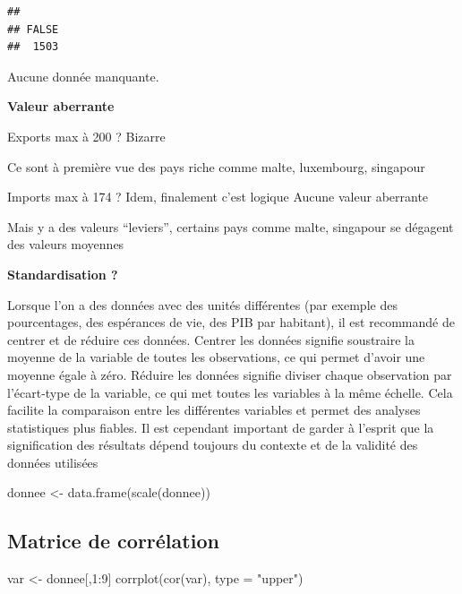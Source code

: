 \documentclass[
]{article}
\newenvironment{Shaded}{}{}
\newcommand{\AttributeTok}[1]{#1}
\newcommand{\DecValTok}[1]{#1}
\newcommand{\FunctionTok}[1]{#1}
\newcommand{\NormalTok}[1]{#1}
\newcommand{\OtherTok}[1]{\textcolor[rgb]{1.00,0.25,0.00}{#1}}
\newcommand{\SpecialCharTok}[1]{\textcolor[rgb]{0.00,0.50,0.50}{#1}}
\newcommand{\StringTok}[1]{\textcolor[rgb]{0.00,0.50,0.50}{#1}}
\begin{document}
\begin{verbatim}
## 
## FALSE 
##  1503
\end{verbatim}

Aucune donnée manquante.

\textbf{Valeur aberrante}

Exports max à 200 ? Bizarre

Ce sont à première vue des pays riche comme malte, luxembourg, singapour

Imports max à 174 ? Idem, finalement c'est logique Aucune valeur
aberrante

Mais y a des valeurs ``leviers'', certains pays comme malte, singapour
se dégagent des valeurs moyennes

\textbf{Standardisation ?}

Lorsque l'on a des données avec des unités différentes (par exemple des
pourcentages, des espérances de vie, des PIB par habitant), il est
recommandé de centrer et de réduire ces données. Centrer les données
signifie soustraire la moyenne de la variable de toutes les
observations, ce qui permet d'avoir une moyenne égale à zéro. Réduire
les données signifie diviser chaque observation par l'écart-type de la
variable, ce qui met toutes les variables à la même échelle. Cela
facilite la comparaison entre les différentes variables et permet des
analyses statistiques plus fiables. Il est cependant important de garder
à l'esprit que la signification des résultats dépend toujours du
contexte et de la validité des données utilisées

\begin{Shaded}
\begin{Highlighting}[]
\NormalTok{donnee }\OtherTok{\textless{}{-}} \FunctionTok{data.frame}\NormalTok{(}\FunctionTok{scale}\NormalTok{(donnee))}
\end{Highlighting}
\end{Shaded}

\hypertarget{matrice-de-corruxe9lation}{%
\subsection{Matrice de corrélation}\label{matrice-de-corruxe9lation}}

\begin{Shaded}
\begin{Highlighting}[]
\NormalTok{var }\OtherTok{\textless{}{-}}\NormalTok{ donnee[,}\DecValTok{1}\SpecialCharTok{:}\DecValTok{9}\NormalTok{]}
\FunctionTok{corrplot}\NormalTok{(}\FunctionTok{cor}\NormalTok{(var), }\AttributeTok{type =} \StringTok{"upper"}\NormalTok{)}
\end{Highlighting}
\end{Shaded}
\end{document}
